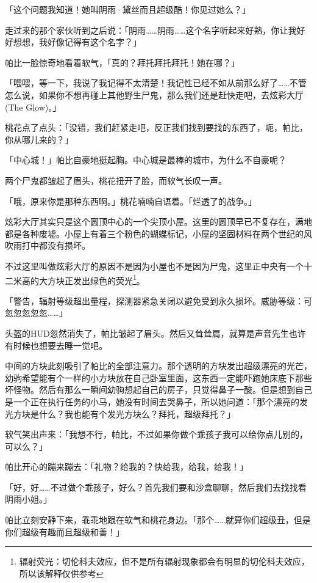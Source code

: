 「这个问题我知道！她叫阴雨·黛丝而且超级酷！你见过她么？」

走过来的那个家伙听到之后说：「阴雨……阴雨……这个名字听起来好熟，你让我好好想想，我好像记得有这个名字？」

帕比一脸惊奇地看着软气，「真的？拜托拜托拜托！她在哪？」

「喂喂，等一下，我说了我记得不太清楚！我记性已经不如从前那么好了……不管怎么说，如果你不想再碰上其他野生尸鬼，那么我们还是赶快走吧，去炫彩大厅 (The Glow)。」

桃花点了点头：「没错，我们赶紧走吧，反正我们找到要找的东西了，呃，帕比，你从哪儿来的？」

「中心城！」帕比自豪地挺起胸。中心城是最棒的城市，为什么不自豪呢？

两个尸鬼都皱起了眉头，桃花扭开了脸，而软气长叹一声。

「哦，原来你是那种东西啊。」桃花喃喃自语着。「烂透了的战争。」

\horizonline


炫彩大厅其实只是这个圆顶中心的一个尖顶小屋。这里的圆顶早已不复存在，满地都是各种废墟。小屋上有着三个粉色的蝴蝶标记，小屋的坚固材料在两个世纪的风吹雨打中都没有损坏。

不过这里叫做炫彩大厅的原因不是因为小屋也不是因为尸鬼，这里正中央有一个十二米高的大方块正发出绿色的荧光\footnote{辐射荧光：切伦科夫效应，但不是所有辐射现象都会有明显的切伦科夫效应，所以该解释仅供参考}。

「{\mt 警告，辐射等级超出量程，探测器紧急关闭以避免受到永久损坏。威胁等级：可忽忽忽忽忽……}」

头盔的HUD忽然消失了，帕比皱起了眉头。然后又耸耸肩，就算是声音先生也许有时候也想要去睡一觉吧。

中间的方块此刻吸引了帕比的全部注意力。那个透明的方块发出超级漂亮的光芒，幼驹希望能有个一样的小方块放在自己卧室里面，这东西一定能吓跑她床底下那些坏怪物。然后有那么一瞬间幼驹想起自己的房子，只觉得鼻子一酸。但是想到自己是一个正在执行任务的小马，她没有时间去哭鼻子，所以她问道：「那个漂亮的发光方块是什么？我也能有个发光方块么？拜托，超级拜托？」

软气笑出声来：「我想不行，帕比，不过如果你做个乖孩子我可以给你点儿别的，可以么？」

帕比开心的蹦来蹦去：「礼物？给我的？快给我，给我，给我！」

「好，好……不过做个乖孩子，好么？首先我们要和沙盒聊聊，然后我们去找找看阴雨小姐。」

帕比立刻安静下来，乖乖地跟在软气和桃花身边。「那个……就算你们超级丑，但是你们超级有趣而且超级和善！」


